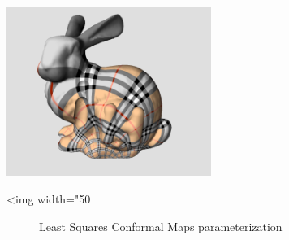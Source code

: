 \begin{center}
    \label{Surface_mesh_parameterization-fig-introduction}
    \begin{ccTexOnly}
        \includegraphics[width=0.5\textwidth]{Surface_mesh_parameterization/introduction} %
    \end{ccTexOnly}
    \begin{ccHtmlOnly}
        <img width="50%
    \end{ccHtmlOnly}
    \begin{figure}[h]
        \caption{Least Squares Conformal Maps parameterization}
    \end{figure}
\end{center}


